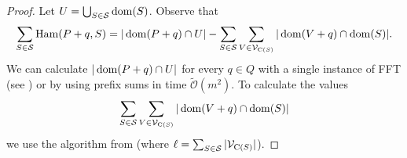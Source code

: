 \documentclass[11pt, letterpaper]{article}
\theoremstyle{plain}
\theoremstyle{definition}
\theoremstyle{remark}
\newcommand{\tO}{\tilde{\mathcal{O}}}
\renewcommand{\S}{\mathcal{S}}
\newcommand{\V}{\mathcal{V}}
\DeclareMathOperator*{\Ham}{Ham}
\begin{document}
\SparseAlgo
\begin{proof}
	Let $U = \bigcup_{S \in \S} \d{S}$. Observe that
	\[ \sum_{S \in \S} \Ham(P + q, S) = |\d{P + q} \cap U| - \sum_{S \in \S}\sum_{V \in \V_{\getchar{S}}} |\d{V + q} \cap \d{S}|.\]
	We can calculate $|\operatorname*{dom}(P + q) \cap U|$ for every $q \in Q$ with a single instance of FFT (see ) or by using prefix sums in time $\tO(m^2)$.
	To calculate the values
	\[ \sum_{S \in \S}\sum_{V \in \V_{\getchar{S}}} |\d{V + q} \cap \d{S}| \]
	we use the algorithm from  (where $\ell = \sum_{S \in \S} |\V_{\getchar{S}}|$).
\end{proof}

















\end{document}
